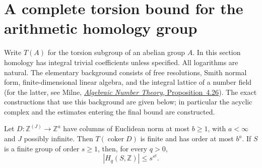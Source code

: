 \section{A complete torsion bound for the arithmetic homology group}
\label{sec:torsion-homology}


Write $T(A)$ for the torsion subgroup of an abelian group $A$.  In this
section homology has integral trivial coefficients unless specified.
All logarithms are natural.  The elementary background consists of
free resolutions, Smith normal form, finite-dimensional linear algebra,
and the integral lattice of a number field (for the latter, see
Milne, \href{https://www.jmilne.org/math/CourseNotes/ANT.pdf}{\emph{Algebraic
Number Theory}, Proposition~4.26}).  The exact constructions
that use this background are given below; in particular the acyclic
complex and the estimates entering the final bound are constructed.

\begin{proposition}
\label{prop:tb-elementary-torsion}
Let $D:\mathbb Z^{(J)}\to\mathbb Z^a$ have columns of Euclidean norm
at most $b\ge1$, with $a<\infty$ and $J$ possibly infinite.  Then
$T(\operatorname{coker}D)$ is finite and has order at most $b^a$.
If $S$ is a finite group of order $s\ge1$, then, for every $q>0$,
\[
       |H_q(S,\mathbb Z)|\le s^{s^q}.
       \tag{TB.1}
\]
\end{proposition}


